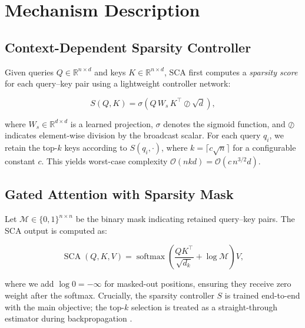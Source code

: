 \section{Mechanism Description}
\label{sec:sca}

\subsection{Context-Dependent Sparsity Controller}

Given queries $Q \in \mathbb{R}^{n \times d}$ and keys $K \in \mathbb{R}^{n \times d}$,
SCA first computes a \textit{sparsity score} for each query--key pair using a lightweight
controller network:

\begin{equation}
  S(Q,K) = \sigma\!\left( Q\,W_s\,K^{\top} \oslash \sqrt{d} \right),
  \label{eq:sparsity-score}
\end{equation}

where $W_s \in \mathbb{R}^{d \times d}$ is a learned projection, $\sigma$ denotes the
sigmoid function, and $\oslash$ indicates element-wise division by the broadcast scalar.
For each query $q_i$, we retain the top-$k$ keys according to $S(q_i, \cdot)$, where
$k = \lceil c\sqrt{n} \rceil$ for a configurable constant $c$. This yields worst-case
complexity $\mathcal{O}(n k d) = \mathcal{O}(c\, n^{3/2} d)$.

\subsection{Gated Attention with Sparsity Mask}

Let $\mathcal{M} \in \{0,1\}^{n \times n}$ be the binary mask indicating retained
query--key pairs. The SCA output is computed as:

\begin{equation}
  \operatorname{SCA}(Q,K,V) = \operatorname{softmax}\!\left(
    \frac{QK^{\top}}{\sqrt{d_k}} + \log \mathcal{M}
  \right) V ,
  \label{eq:sca}
\end{equation}

where we add $\log 0 = -\infty$ for masked-out positions, ensuring they receive zero
weight after the softmax. Crucially, the sparsity controller $S$ is trained end-to-end
with the main objective; the top-$k$ selection is treated as a straight-through estimator
during backpropagation \cite{bengio2013estimating}.
